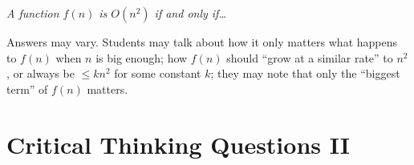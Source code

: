 \documentclass{tufte-handout}
\begin{document}
\begin{questions}
  \emph{A function $f(n)$ is $O(n^2)$ if and only if\dots}

  \begin{answer}
    Answers may vary.  Students may talk about how it only matters
    what happens to $f(n)$ when $n$ is big enough; how $f(n)$ should
    ``grow at a similar rate'' to $n^2$, or always be $\leq kn^2$ for
    some constant $k$; they may note that only the ``biggest term'' of
    $f(n)$ matters.
  \end{answer}
\end{questions}

\pause



\section{Critical Thinking Questions II}
\end{document}
